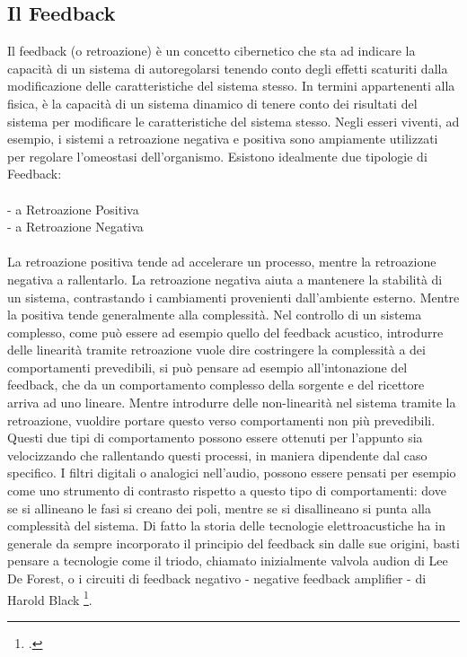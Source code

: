 \subsection{Il Feedback}
\label{sec:Il Feedback}
Il feedback (o retroazione) è un concetto cibernetico che sta ad indicare
la capacità di un sistema di autoregolarsi tenendo conto degli effetti scaturiti
dalla modificazione delle caratteristiche del sistema stesso.
In termini appartenenti alla fisica, è la capacità di un sistema dinamico
di tenere conto dei risultati del sistema per
modificare le caratteristiche del sistema stesso.
Negli esseri viventi, ad esempio, i sistemi a retroazione negativa e positiva
sono ampiamente utilizzati per regolare l'omeostasi dell'organismo.
Esistono idealmente due tipologie di Feedback:
\\ \\
- a Retroazione Positiva
\\
- a Retroazione Negativa
\\ \\
La retroazione positiva tende ad accelerare un processo,
mentre la retroazione negativa a rallentarlo.
La retroazione negativa aiuta a mantenere la stabilità di un sistema,
contrastando i cambiamenti provenienti dall'ambiente esterno.
Mentre la positiva tende generalmente alla complessità.
Nel controllo di un sistema complesso,
come può essere ad esempio quello del feedback acustico,
introdurre delle linearità tramite retroazione
vuole dire costringere la complessità
a dei comportamenti prevedibili, si può pensare ad esempio
all'intonazione del feedback,
che da un comportamento complesso della sorgente e del ricettore arriva
ad uno lineare.
Mentre introdurre delle non-linearità nel sistema tramite la retroazione,
vuoldire portare questo verso comportamenti non più prevedibili.
Questi due tipi di comportamento possono essere ottenuti per l'appunto
sia velocizzando che rallentando questi processi,
in maniera dipendente dal caso specifico.
I filtri digitali o analogici nell'audio,
possono essere pensati per esempio come uno strumento
di contrasto rispetto a questo tipo di comportamenti:
dove se si allineano le fasi si creano dei poli,
mentre se si disallineano si punta alla complessità del sistema.
Di fatto la storia delle tecnologie elettroacustiche ha in generale
da sempre incorporato il principio
del feedback sin dalle sue origini, basti pensare a tecnologie
come il triodo, chiamato inizialmente valvola audion di Lee De Forest,
o i circuiti di feedback negativo - negative feedback amplifier - di Harold Black
\footcite{echodiscipio}.
